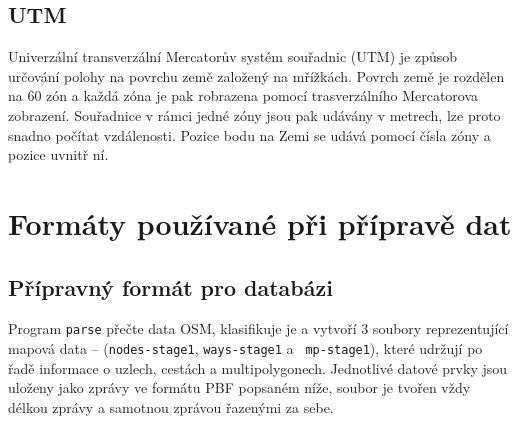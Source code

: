 \subsection{UTM}
Univerzální transverzální Mercatorův systém souřadnic (UTM) \cite{UTM} je způsob
určování polohy na povrchu země založený na mřížkách. Povrch země je rozdělen na
60 zón a každá zóna je pak robrazena pomocí trasverzálního Mercatorova
zobrazení. Souřadnice v rámci jedné zóny jsou pak udávány v metrech, lze proto
snadno počítat vzdálenosti. Pozice bodu na Zemi se udává pomocí čísla zóny a
pozice uvnitř ní. 

\section{Formáty používané při přípravě dat}
\label{ch:formaty-dat:priprava}
\subsection{Přípravný formát pro databázi}
Program {\tt parse} přečte data OSM, klasifikuje je a vytvoří 3 soubory
reprezentující mapová data -- ({\tt nodes-stage1}, {\tt ways-stage1} a {\tt
mp-stage1}), které udržují po řadě
informace o uzlech, cestách a multipolygonech. Jednotlivé datové prvky jsou
uloženy jako zprávy ve formátu PBF popsaném níže, soubor je tvořen vždy délkou
zprávy a samotnou zprávou řazenými za sebe. 

